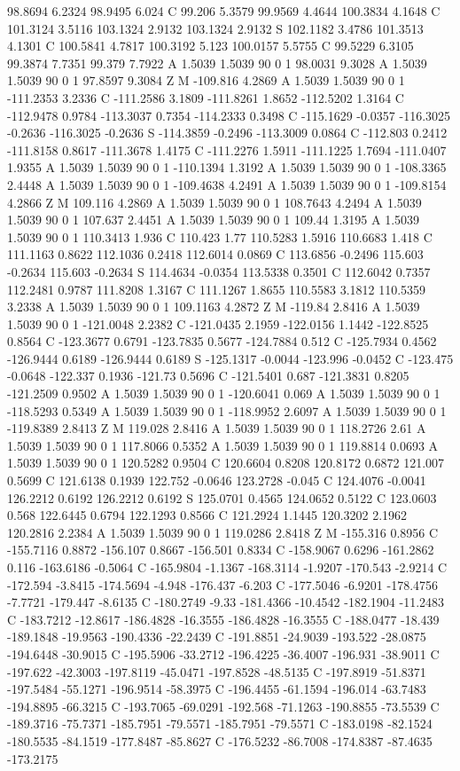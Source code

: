 {{{98.8694 6.2324 98.9495 6.024 C 99.206 5.3579 99.9569 4.4644 100.3834 4.1648 C 101.3124 3.5116 103.1324 2.9132 103.1324 2.9132 S 102.1182 3.4786 101.3513 4.1301 C 100.5841 4.7817 100.3192 5.123 100.0157 5.5755 C 99.5229 6.3105 99.3874 7.7351 99.379 7.7922 A 1.5039 1.5039 90 0 1 98.0031 9.3028 A 1.5039 1.5039 90 0 1 97.8597 9.3084 Z M -109.816 4.2869 A 1.5039 1.5039 90 0 1 -111.2353 3.2336 C -111.2586 3.1809 -111.8261 1.8652 -112.5202 1.3164 C -112.9478 0.9784 -113.3037 0.7354 -114.2333 0.3498 C -115.1629 -0.0357 -116.3025 -0.2636 -116.3025 -0.2636 S -114.3859 -0.2496 -113.3009 0.0864 C -112.803 0.2412 -111.8158 0.8617 -111.3678 1.4175 C -111.2276 1.5911 -111.1225 1.7694 -111.0407 1.9355 A 1.5039 1.5039 90 0 1 -110.1394 1.3192 A 1.5039 1.5039 90 0 1 -108.3365 2.4448 A 1.5039 1.5039 90 0 1 -109.4638 4.2491 A 1.5039 1.5039 90 0 1 -109.8154 4.2866 Z M 109.116 4.2869 A 1.5039 1.5039 90 0 1 108.7643 4.2494 A 1.5039 1.5039 90 0 1 107.637 2.4451 A 1.5039 1.5039 90 0 1 109.44 1.3195 A 1.5039 1.5039 90 0 1 110.3413 1.936 C 110.423 1.77 110.5283 1.5916 110.6683 1.418 C 111.1163 0.8622 112.1036 0.2418 112.6014 0.0869 C 113.6856 -0.2496 115.603 -0.2634 115.603 -0.2634 S 114.4634 -0.0354 113.5338 0.3501 C 112.6042 0.7357 112.2481 0.9787 111.8208 1.3167 C 111.1267 1.8655 110.5583 3.1812 110.5359 3.2338 A 1.5039 1.5039 90 0 1 109.1163 4.2872 Z M -119.84 2.8416 A 1.5039 1.5039 90 0 1 -121.0048 2.2382 C -121.0435 2.1959 -122.0156 1.1442 -122.8525 0.8564 C -123.3677 0.6791 -123.7835 0.5677 -124.7884 0.512 C -125.7934 0.4562 -126.9444 0.6189 -126.9444 0.6189 S -125.1317 -0.0044 -123.996 -0.0452 C -123.475 -0.0648 -122.337 0.1936 -121.73 0.5696 C -121.5401 0.687 -121.3831 0.8205 -121.2509 0.9502 A 1.5039 1.5039 90 0 1 -120.6041 0.069 A 1.5039 1.5039 90 0 1 -118.5293 0.5349 A 1.5039 1.5039 90 0 1 -118.9952 2.6097 A 1.5039 1.5039 90 0 1 -119.8389 2.8413 Z M 119.028 2.8416 A 1.5039 1.5039 90 0 1 118.2726 2.61 A 1.5039 1.5039 90 0 1 117.8066 0.5352 A 1.5039 1.5039 90 0 1 119.8814 0.0693 A 1.5039 1.5039 90 0 1 120.5282 0.9504 C 120.6604 0.8208 120.8172 0.6872 121.007 0.5699 C 121.6138 0.1939 122.752 -0.0646 123.2728 -0.045 C 124.4076 -0.0041 126.2212 0.6192 126.2212 0.6192 S 125.0701 0.4565 124.0652 0.5122 C 123.0603 0.568 122.6445 0.6794 122.1293 0.8566 C 121.2924 1.1445 120.3202 2.1962 120.2816 2.2384 A 1.5039 1.5039 90 0 1 119.0286 2.8418 Z M -155.316 0.8956 C -155.7116 0.8872 -156.107 0.8667 -156.501 0.8334 C -158.9067 0.6296 -161.2862 0.116 -163.6186 -0.5064 C -165.9804 -1.1367 -168.3114 -1.9207 -170.543 -2.9214 C -172.594 -3.8415 -174.5694 -4.948 -176.437 -6.203 C -177.5046 -6.9201 -178.4756 -7.7721 -179.447 -8.6135 C -180.2749 -9.33 -181.4366 -10.4542 -182.1904 -11.2483 C -183.7212 -12.8617 -186.4828 -16.3555 -186.4828 -16.3555 C -188.0477 -18.439 -189.1848 -19.9563 -190.4336 -22.2439 C -191.8851 -24.9039 -193.522 -28.0875 -194.6448 -30.9015 C -195.5906 -33.2712 -196.4225 -36.4007 -196.931 -38.9011 C -197.622 -42.3003 -197.8119 -45.0471 -197.8528 -48.5135 C -197.8919 -51.8371 -197.5484 -55.1271 -196.9514 -58.3975 C -196.4455 -61.1594 -196.014 -63.7483 -194.8895 -66.3215 C -193.7065 -69.0291 -192.568 -71.1263 -190.8855 -73.5539 C -189.3716 -75.7371 -185.7951 -79.5571 -185.7951 -79.5571 C -183.0198 -82.1524 -180.5535 -84.1519 -177.8487 -85.8627 C -176.5232 -86.7008 -174.8387 -87.4635 -173.2175 }}}
